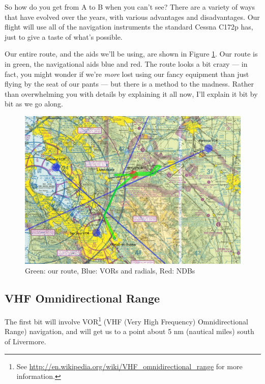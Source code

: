 So how do you get from A to B when you can't see?  There are a variety
of ways that have evolved over the years, with various advantages and
disadvantages.  Our flight will use all of the navigation instruments
the standard Cessna C172p has, just to give a taste of what's
possible.

Our entire route, and the aids we'll be using, are shown in
Figure \ref{fig:sectional_labelled}.  Our route is in green, the
navigational aids blue and red.  The route looks a bit crazy --- in
fact, you might wonder if we're \emph{more} lost using our fancy
equipment than just flying by the seat of our pants --- but there is a
method to the madness.  Rather than overwhelming you with details by
explaining it all now, I'll explain it bit by bit as we go along.

\begin{figure}
  \begin{center}
    \includegraphics[width=20cm, angle=-90]{img/sectional_labelled}
    \caption{Green: our route, Blue: VORs and radials, Red: NDBs}
    \label{fig:sectional_labelled}
  \end{center}
\end{figure}


\subsection{VHF Omnidirectional Range}

The first bit will involve VOR\footnote{See
  \url{http://en.wikipedia.org/wiki/VHF_omnidirectional_range} for
  more information.} (VHF (Very High Frequency) Omnidirectional Range)
navigation, and will get us to a point about 5 nm (nautical miles)
south of Livermore.

